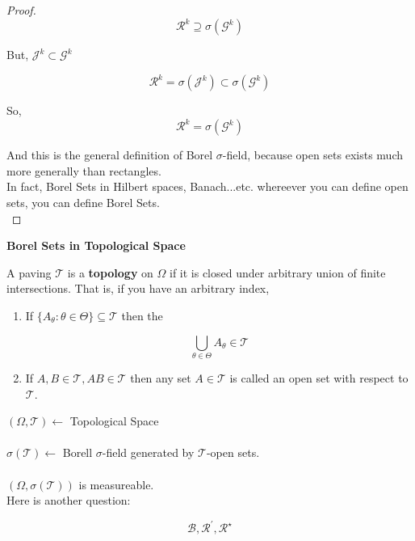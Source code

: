 \documentclass[11pt,fleqn]{book} %
\begin{document}
\begin{proof}
	$$\mathcal{R}^k \supseteq \sigma(\mathcal{G}^k) $$

	But, $\mathcal{J}^k \subset \mathcal{G}^k$

		$$ \mathcal{R}^k = \sigma(\mathcal{J}^k) \subset \sigma(\mathcal{G}^k) $$

So, $$\mathcal{R}^k =  \sigma(\mathcal{G}^k) $$

And this is the general definition of Borel $\sigma$-field, because open sets exists much more generally than rectangles. \\

In fact, Borel Sets in Hilbert spaces, Banach...etc. whereever you can define open sets, you can define Borel Sets.\\
	
\end{proof}


\textbf{Borel Sets in Topological Space}\\

\begin{definition}[Topology]
	A paving $\mathcal{T}$ is a \textbf{topology} on $\Omega$ if it is closed under arbitrary union of finite intersections. That is, if you have an arbitrary index, 

	\begin{enumerate}
		\item If $\{A_\theta: \theta \in \Theta \} \subseteq \mathcal{T}$ then the

		$$\bigcup_{\theta \in \Theta} A_\theta \in \mathcal{T} $$

		\item If $A, B \in \mathcal{T}, AB \in \mathcal{T}$ then any set $A \in \mathcal{T}$ is called an open set with respect to $\mathcal{T}$.
	\end{enumerate}
	
\end{definition}


$(\Omega, \mathcal{T}) \leftarrow$ Topological Space\\
\\
$\sigma(\mathcal{T}) \leftarrow$ Borell $\sigma$-field generated by $\mathcal{T}$-open sets.\\
\\

$(\Omega, \sigma(\mathcal{T})) $ is measureable. \\

Here is another question: 

	$$\mathcal{B}, \mathcal{R}^\prime, \mathcal{R}^\star$$
\end{document}
